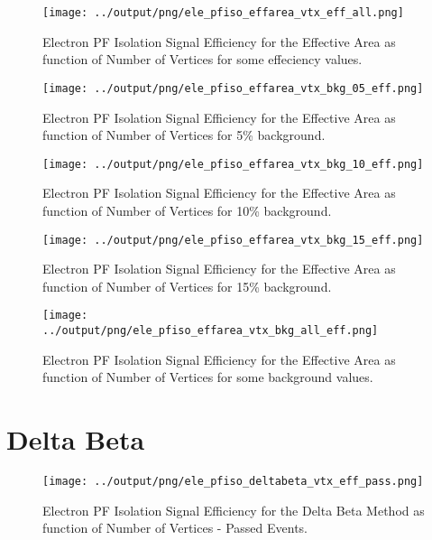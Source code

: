 \documentclass[11pt]{book}
\begin{document}
\begin{figure}[htb]
\centering
\texttt{[image: ../output/png/ele\_pfiso\_effarea\_vtx\_eff\_all.png]}
\caption{Electron PF Isolation Signal Efficiency for the Effective Area as function of Number of Vertices for some effeciency values.}
\label{fig:ele_pfiso_vtx_eff_effarea_eff_all}
\end{figure}

\begin{figure}[htb]
\centering
\texttt{[image: ../output/png/ele\_pfiso\_effarea\_vtx\_bkg\_05\_eff.png]}
\caption{Electron PF Isolation Signal Efficiency for the Effective Area as function of Number of Vertices for 5\% background.}
\label{fig:ele_pfiso_vtx_eff_effarea_bkg_05_eff}
\end{figure}

\begin{figure}[htb]
\centering
\texttt{[image: ../output/png/ele\_pfiso\_effarea\_vtx\_bkg\_10\_eff.png]}
\caption{Electron PF Isolation Signal Efficiency for the Effective Area as function of Number of Vertices for 10\% background.}
\label{fig:ele_pfiso_vtx_eff_effarea_bkg_10_eff}
\end{figure}

\begin{figure}[htb]
\centering
\texttt{[image: ../output/png/ele\_pfiso\_effarea\_vtx\_bkg\_15\_eff.png]}
\caption{Electron PF Isolation Signal Efficiency for the Effective Area as function of Number of Vertices for 15\% background.}
\label{fig:ele_pfiso_vtx_eff_effarea_bkg_15_eff}
\end{figure}

\begin{figure}[htb]
\centering
\texttt{[image: ../output/png/ele\_pfiso\_effarea\_vtx\_bkg\_all\_eff.png]}
\caption{Electron PF Isolation Signal Efficiency for the Effective Area as function of Number of Vertices for some background values.}
\label{fig:ele_pfiso_vtx_eff_effarea_bkg_all_eff}
\end{figure}
\clearpage

\section{Delta Beta}
\begin{figure}[htb]
\centering
\texttt{[image: ../output/png/ele\_pfiso\_deltabeta\_vtx\_eff\_pass.png]}
\caption{Electron PF Isolation Signal Efficiency for the Delta Beta Method as function of Number of Vertices - Passed Events.}
\label{fig:ele_pfiso_vtx_eff_deltabeta_pass}
\end{figure}
\end{document}
